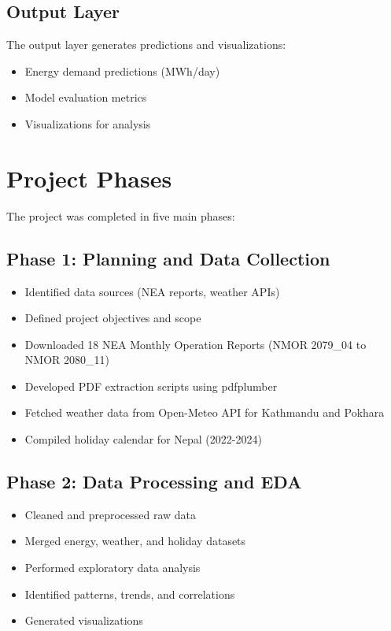 	\subsection{Output Layer}
	The output layer generates predictions and visualizations:
	\begin{itemize}
		\item Energy demand predictions (MWh/day)
		\item Model evaluation metrics
		\item Visualizations for analysis
	\end{itemize}

	\pagebreak
	\section{Project Phases}
	The project was completed in five main phases:

	\subsection{Phase 1: Planning and Data Collection}
	\begin{itemize}
		\item Identified data sources (NEA reports, weather APIs)
		\item Defined project objectives and scope
		\item Downloaded 18 NEA Monthly Operation Reports (NMOR 2079\_04 to NMOR 2080\_11)
		\item Developed PDF extraction scripts using pdfplumber
		\item Fetched weather data from Open-Meteo API for Kathmandu and Pokhara
		\item Compiled holiday calendar for Nepal (2022-2024)
	\end{itemize}

	\subsection{Phase 2: Data Processing and EDA}
	\begin{itemize}
		\item Cleaned and preprocessed raw data
		\item Merged energy, weather, and holiday datasets
		\item Performed exploratory data analysis
		\item Identified patterns, trends, and correlations
		\item Generated visualizations
	\end{itemize}

